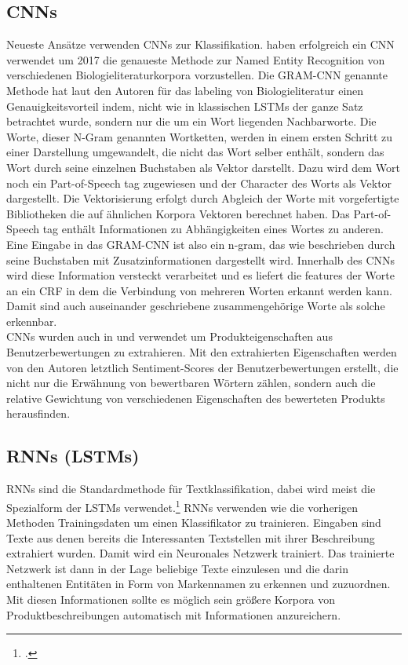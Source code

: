 \documentclass[paper=a4,12pt,listof=totoc]{scrartcl}%
\begin{document}
	\subsection{CNNs}
	Neueste Ansätze verwenden CNNs zur Klassifikation. \cite{Zhu.2018} haben erfolgreich ein CNN verwendet um 2017 die genaueste Methode zur Named Entity Recognition von verschiedenen Biologieliteraturkorpora vorzustellen. Die GRAM-CNN genannte Methode hat laut den Autoren für das labeling von Biologieliteratur einen Genauigkeitsvorteil indem, nicht wie in klassischen LSTMs der ganze Satz betrachtet wurde, sondern nur die um ein Wort liegenden Nachbarworte. Die Worte, dieser N-Gram genannten Wortketten, werden in einem ersten Schritt zu einer Darstellung umgewandelt, die nicht das Wort selber enthält, sondern das Wort durch seine einzelnen Buchstaben als Vektor darstellt. Dazu wird dem Wort noch ein Part-of-Speech tag zugewiesen und der Character des Worts als Vektor dargestellt. 
	Die Vektorisierung erfolgt durch Abgleich der Worte mit vorgefertigte Bibliotheken die auf ähnlichen Korpora Vektoren berechnet haben. Das Part-of-Speech tag enthält Informationen zu Abhängigkeiten eines Wortes zu anderen. Eine Eingabe in das GRAM-CNN ist also ein n-gram, das wie beschrieben durch seine Buchstaben mit Zusatzinformationen dargestellt wird.
	Innerhalb des CNNs wird diese Information versteckt verarbeitet und es liefert die features der Worte an ein CRF in dem die Verbindung von mehreren Worten erkannt werden kann. Damit sind auch auseinander geschriebene zusammengehörige Worte als solche erkennbar.\\
	CNNs wurden auch in \cite{Lee.2019} und \cite{Lee.2020} verwendet um Produkteigenschaften aus Benutzerbewertungen zu extrahieren. Mit den extrahierten Eigenschaften werden von den Autoren letztlich Sentiment-Scores der Benutzerbewertungen erstellt, die nicht nur die Erwähnung von bewertbaren Wörtern zählen, sondern auch die relative Gewichtung von verschiedenen Eigenschaften des bewerteten Produkts herausfinden.\\
	\subsection{RNNs (LSTMs)}
	RNNs sind die Standardmethode für Textklassifikation, dabei wird meist die Spezialform der LSTMs verwendet.\footcite{Majumder.2018}
	RNNs verwenden wie die vorherigen Methoden Trainingsdaten um einen Klassifikator zu trainieren. Eingaben sind Texte aus denen bereits die Interessanten Textstellen mit ihrer Beschreibung extrahiert wurden. Damit wird ein Neuronales Netzwerk trainiert.
	Das trainierte Netzwerk ist dann in der Lage beliebige Texte einzulesen und die darin enthaltenen Entitäten in Form von Markennamen zu erkennen und zuzuordnen. Mit diesen Informationen sollte es möglich sein größere Korpora von Produktbeschreibungen automatisch mit Informationen anzureichern.
\end{document}
